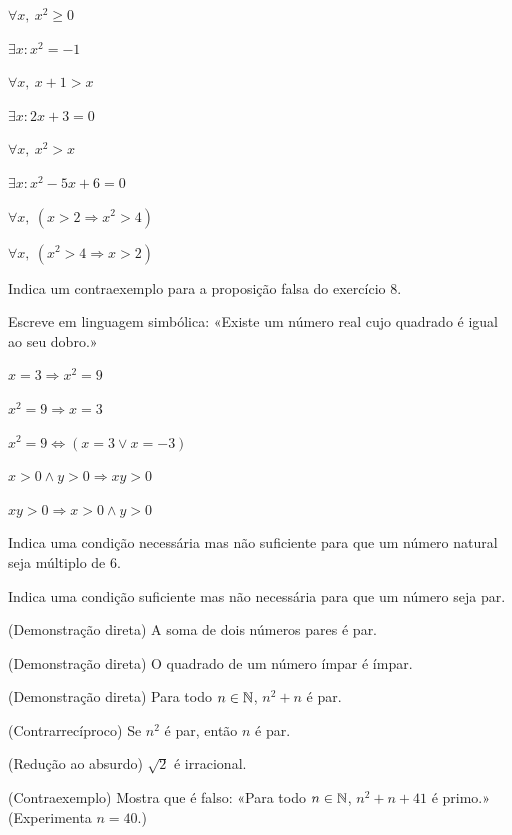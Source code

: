 \documentclass[12pt]{article}
\begin{document}
\begin{exercicios}
  \item $\forall x,\ x^2 \ge 0$
  \item $\exists x : x^2 = -1$
  \item $\forall x,\ x + 1 > x$
  \item $\exists x : 2x + 3 = 0$
  \item $\forall x,\ x^2 > x$
  \item $\exists x : x^2 - 5x + 6 = 0$
  \item $\forall x,\ (x > 2 \Rightarrow x^2 > 4)$
  \item $\forall x,\ (x^2 > 4 \Rightarrow x > 2)$
  \item Indica um contraexemplo para a proposição falsa do exercício 8.
  \item Escreve em linguagem simbólica: «Existe um número real cujo quadrado é igual ao seu dobro.»
\end{exercicios}

\begin{exercicios}
  \item $x = 3 \Rightarrow x^2 = 9$
  \item $x^2 = 9 \Rightarrow x = 3$
  \item $x^2 = 9 \Leftrightarrow (x = 3 \vee x = -3)$
  \item $x > 0 \wedge y > 0 \Rightarrow xy > 0$
  \item $xy > 0 \Rightarrow x > 0 \wedge y > 0$
  \item Indica uma condição necessária mas não suficiente para que um número natural seja múltiplo de 6.
  \item Indica uma condição suficiente mas não necessária para que um número seja par.
\end{exercicios}

\begin{exercicios}
  \item (Demonstração direta) A soma de dois números pares é par.
  \item (Demonstração direta) O quadrado de um número ímpar é ímpar.
  \item (Demonstração direta) Para todo $n \in \mathbb{N}$, $n^2 + n$ é par.
  \item (Contrarrecíproco) Se $n^2$ é par, então $n$ é par.
  \item (Redução ao absurdo) $\sqrt{2}$ é irracional.
  \item (Contraexemplo) Mostra que é falso: «Para todo $n \in \mathbb{N}$, $n^2 + n + 41$ é primo.» (Experimenta $n = 40$.)
\end{exercicios}
\end{document}
